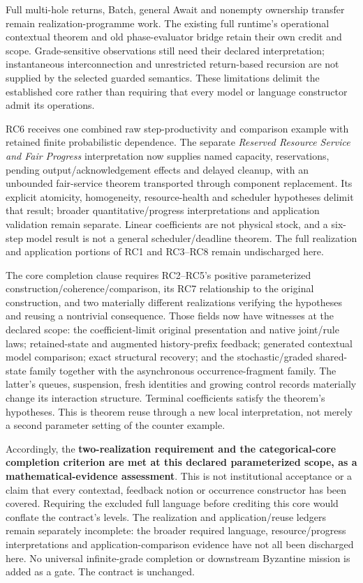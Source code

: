 \documentclass[11pt]{article}
\begin{document}
Full multi-hole returns, Batch, general Await and nonempty ownership transfer remain realization-programme work. The existing full runtime's operational contextual theorem and old phase-evaluator bridge retain their own credit and scope. Grade-sensitive observations still need their declared interpretation; instantaneous interconnection and unrestricted return-based recursion are not supplied by the selected guarded semantics. These limitations delimit the established core rather than requiring that every model or language constructor admit its operations.

RC6 receives one combined raw step-productivity and comparison example with retained finite probabilistic dependence. The separate \emph{Reserved Resource Service and Fair Progress} interpretation now supplies named capacity, reservations, pending output/acknowledgement effects and delayed cleanup, with an unbounded fair-service theorem transported through component replacement. Its explicit atomicity, homogeneity, resource-health and scheduler hypotheses delimit that result; broader quantitative/progress interpretations and application validation remain separate. Linear coefficients are not physical stock, and a six-step model result is not a general scheduler/deadline theorem. The full realization and application portions of RC1 and RC3--RC8 remain undischarged here.

The core completion clause requires RC2--RC5's positive parameterized construction/coherence/comparison, its RC7 relationship to the original construction, and two materially different realizations verifying the hypotheses and reusing a nontrivial consequence. Those fields now have witnesses at the declared scope: the coefficient-limit original presentation and native joint/rule laws; retained-state and augmented history-prefix feedback; generated contextual model comparison; exact structural recovery; and the stochastic/graded shared-state family together with the asynchronous occurrence-fragment family. The latter's queues, suspension, fresh identities and growing control records materially change its interaction structure. Terminal coefficients satisfy the theorem's hypotheses. This is theorem reuse through a new local interpretation, not merely a second parameter setting of the counter example.

Accordingly, the \textbf{two-realization requirement and the categorical-core completion criterion are met at this declared parameterized scope, as a mathematical-evidence assessment}. This is not institutional acceptance or a claim that every contextad, feedback notion or occurrence constructor has been covered. Requiring the excluded full language before crediting this core would conflate the contract's levels. The realization and application/reuse ledgers remain separately incomplete: the broader required language, resource/progress interpretations and application-comparison evidence have not all been discharged here. No universal infinite-grade completion or downstream Byzantine mission is added as a gate. The contract is unchanged.
\end{document}
